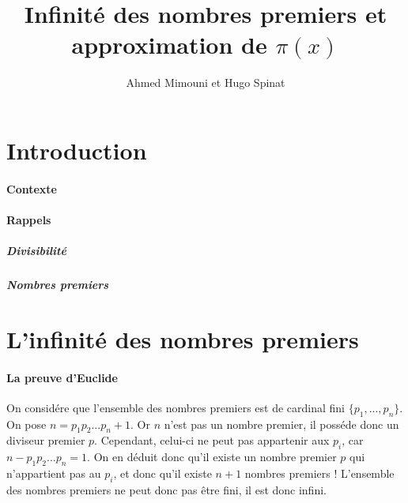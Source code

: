 \documentclass[a4paper]{article}
\begin{document}
\setcounter{secnumdepth}{0}
\setcounter{tocdepth}{2}
\title{Infinité des nombres premiers et approximation de $\pi(x)$}
\author{Ahmed Mimouni et Hugo Spinat}
\maketitle
\tableofcontents


\pagebreak
\begin{abstract}
\end{abstract}
\pagebreak
\part*{Introduction}
  \subsection{Contexte}
  
  \subsection{Rappels}
    \subsubsection{Divisibilité}
    \subsubsection{Nombres premiers}
    
\part{L'infinité des nombres premiers}
  \subsection{La preuve d'Euclide}
    On considére que l'ensemble des nombres premiers est de cardinal fini $\{ p_1, ..., p_n \}$. On pose $n = p_1p_2...p_n + 1$.
    Or $n$ n'est pas un nombre premier, il posséde donc un diviseur premier $p$. Cependant, celui-ci ne peut pas appartenir aux $p_i$, car $n - p_1p_2...p_n = 1$.
    On en déduit donc qu'il existe un nombre premier $p$ qui n'appartient pas au $p_i$, et donc qu'il existe $n + 1$ nombres premiers !
    L'ensemble des nombres premiers ne peut donc pas être fini, il est donc infini.
\end{document}
